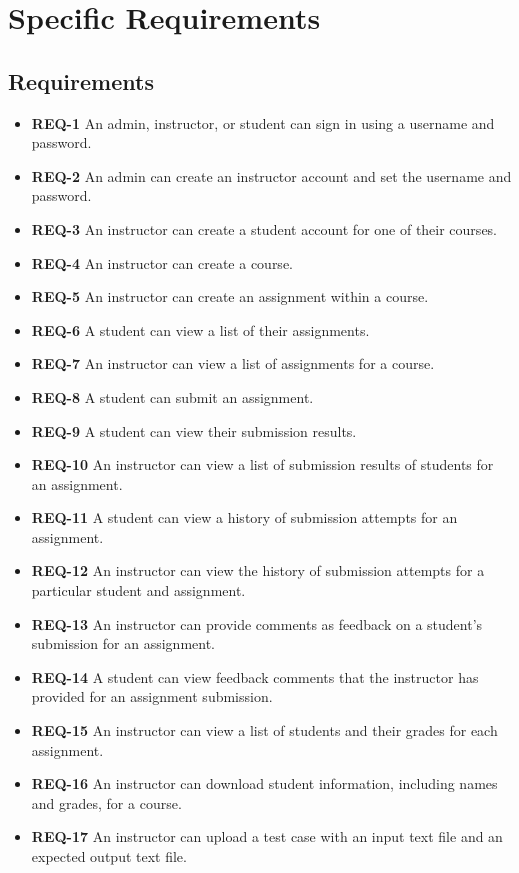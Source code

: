 \documentclass{article}
\begin{document}
\section{Specific Requirements}

\subsection{Requirements}

\begin{itemize}
  \item \textbf{REQ-1} An admin, instructor, or student can sign in using a username and password.
  \item \textbf{REQ-2} An admin can create an instructor account and set the username and password.
  \item \textbf{REQ-3} An instructor can create a student account for one of their courses.
  \item \textbf{REQ-4} An instructor can create a course.
  \item \textbf{REQ-5} An instructor can create an assignment within a course.
  \item \textbf{REQ-6} A student can view a list of their assignments.
  \item \textbf{REQ-7} An instructor can view a list of assignments for a course.
  \item \textbf{REQ-8} A student can submit an assignment.
  \item \textbf{REQ-9} A student can view their submission results.
  \item \textbf{REQ-10} An instructor can view a list of submission results of students for an assignment.
  \item \textbf{REQ-11} A student can view a history of submission attempts for an assignment.
  \item \textbf{REQ-12} An instructor can view the history of submission attempts for a particular student and assignment.
  \item \textbf{REQ-13} An instructor can provide comments as feedback on a student's submission for an assignment.
  \item \textbf{REQ-14} A student can view feedback comments that the instructor has provided for an assignment submission.
  \item \textbf{REQ-15} An instructor can view a list of students and their grades for each assignment.
  \item \textbf{REQ-16} An instructor can download student information, including names and grades, for a course.
  \item \textbf{REQ-17} An instructor can upload a test case with an input text file and an expected output text file.
\end{itemize}
\end{document}
